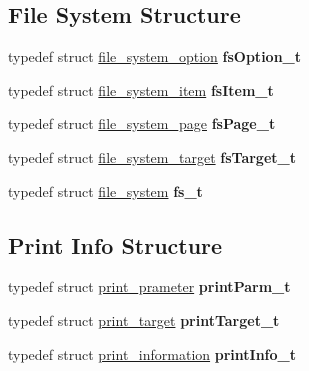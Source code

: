 \subsection*{File System Structure}
\begin{DoxyCompactItemize}
\item 
\mbox{\label{group__MODULE__FILE__SYSTEM_gab6040c649e68b520ff89a6f4b1f6005a}} 
typedef struct \hyperlink{structfile__system__option}{file\+\_\+system\+\_\+option} {\bfseries fs\+Option\+\_\+t}
\item 
\mbox{\label{group__MODULE__FILE__SYSTEM_gaeab255dbc7ceef81d36909713801e7c7}} 
typedef struct \hyperlink{structfile__system__item}{file\+\_\+system\+\_\+item} {\bfseries fs\+Item\+\_\+t}
\item 
\mbox{\label{group__MODULE__FILE__SYSTEM_ga3b8cfae46ce854ad9d5ceef195207415}} 
typedef struct \hyperlink{structfile__system__page}{file\+\_\+system\+\_\+page} {\bfseries fs\+Page\+\_\+t}
\item 
\mbox{\label{group__MODULE__FILE__SYSTEM_ga54db375acffc6c735584fd162e02afc6}} 
typedef struct \hyperlink{structfile__system__target}{file\+\_\+system\+\_\+target} {\bfseries fs\+Target\+\_\+t}
\item 
\mbox{\label{group__MODULE__FILE__SYSTEM_ga7fa1dc20e14a7ce6678e688769e43590}} 
typedef struct \hyperlink{structfile__system}{file\+\_\+system} {\bfseries fs\+\_\+t}
\end{DoxyCompactItemize}
\subsection*{Print Info Structure}
\begin{DoxyCompactItemize}
\item 
\mbox{\label{group__MODULE__FILE__SYSTEM_ga39d67ce4f6a93964f9afbc5a6b7df8a1}} 
typedef struct \hyperlink{structprint__prameter}{print\+\_\+prameter} {\bfseries print\+Parm\+\_\+t}
\item 
\mbox{\label{group__MODULE__FILE__SYSTEM_ga4ecfce743a942dc0e661c962dd7df711}} 
typedef struct \hyperlink{structprint__target}{print\+\_\+target} {\bfseries print\+Target\+\_\+t}
\item 
\mbox{\label{group__MODULE__FILE__SYSTEM_ga585e6d82351d46f430de59f44d197bf5}} 
typedef struct \hyperlink{structprint__information}{print\+\_\+information} {\bfseries print\+Info\+\_\+t}
\end{DoxyCompactItemize}
